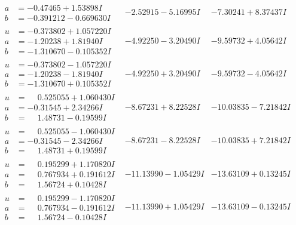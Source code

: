 \documentclass[1p]{elsarticle_modified}
\theoremstyle{definition}
\begin{document}
$$\begin{array}{c|c|c}
\begin{aligned}
a &= -0.47465 + 1.53898 I \\
b &= -0.391212 - 0.669630 I\end{aligned}
 & -2.52915 - 5.16995 I & -7.30241 + 8.37437 I \\ \hline\begin{aligned}
u &= -0.373802 + 1.057220 I \\
a &= -1.20238 + 1.81940 I \\
b &= -1.310670 - 0.105352 I\end{aligned}
 & -4.92250 - 3.20490 I & -9.59732 + 4.05642 I \\ \hline\begin{aligned}
u &= -0.373802 - 1.057220 I \\
a &= -1.20238 - 1.81940 I \\
b &= -1.310670 + 0.105352 I\end{aligned}
 & -4.92250 + 3.20490 I & -9.59732 - 4.05642 I \\ \hline\begin{aligned}
u &= \phantom{-}0.525055 + 1.060430 I \\
a &= -0.31545 + 2.34266 I \\
b &= \phantom{-}1.48731 - 0.19599 I\end{aligned}
 & -8.67231 + 8.22528 I & -10.03835 - 7.21842 I \\ \hline\begin{aligned}
u &= \phantom{-}0.525055 - 1.060430 I \\
a &= -0.31545 - 2.34266 I \\
b &= \phantom{-}1.48731 + 0.19599 I\end{aligned}
 & -8.67231 - 8.22528 I & -10.03835 + 7.21842 I \\ \hline\begin{aligned}
u &= \phantom{-}0.195299 + 1.170820 I \\
a &= \phantom{-}0.767934 + 0.191612 I \\
b &= \phantom{-}1.56724 + 0.10428 I\end{aligned}
 & -11.13990 - 1.05429 I & -13.63109 + 0.13245 I \\ \hline\begin{aligned}
u &= \phantom{-}0.195299 - 1.170820 I \\
a &= \phantom{-}0.767934 - 0.191612 I \\
b &= \phantom{-}1.56724 - 0.10428 I\end{aligned}
 & -11.13990 + 1.05429 I & -13.63109 - 0.13245 I \\ \hline\begin{aligned}

\end{aligned}
\end{array}$$
\end{document}
